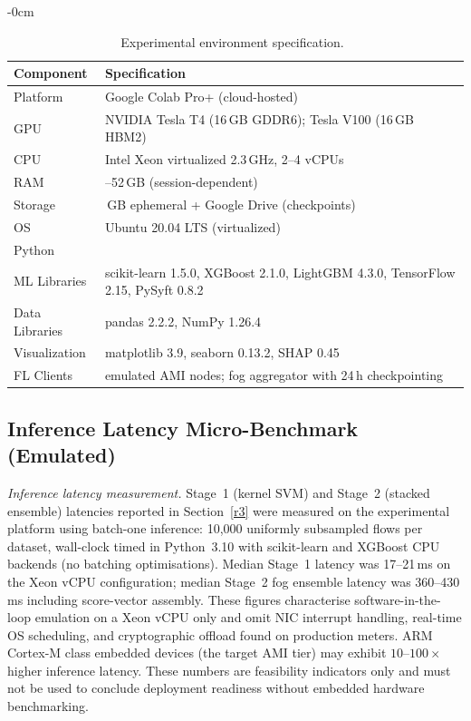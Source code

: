 \documentclass[sensors,article,submit,pdftex,moreauthors]{Definitions/mdpi}
\begin{document}
\begin{table}[H]
\caption{Experimental environment specification.~\label{tab:experimental_env}}
	\begin{adjustwidth}{-\extralength}{0cm}
		\begin{tabularx}{\fulllength}{>{\raggedright\arraybackslash}p{3cm} >{\raggedright\arraybackslash}X}
\toprule
\textbf{Component} & \textbf{Specification} \\
\midrule
Platform        & Google Colab Pro+ (cloud-hosted) \\
GPU             & NVIDIA Tesla T4 (16\,GB GDDR6); Tesla V100 (16\,GB HBM2) \\
CPU             & Intel Xeon virtualized 2.3\,GHz, 2--4 vCPUs \\
RAM             & 26--52\,GB (session-dependent) \\
Storage         & 100\,GB ephemeral + Google Drive (checkpoints) \\
OS              & Ubuntu 20.04 LTS (virtualized) \\
Python          & 3.10 \\
ML Libraries    & scikit-learn 1.5.0, XGBoost 2.1.0, LightGBM 4.3.0, TensorFlow 2.15, PySyft 0.8.2 \\
Data Libraries  & pandas 2.2.2, NumPy 1.26.4 \\
Visualization   & matplotlib 3.9, seaborn 0.13.2, SHAP 0.45 \\
FL Clients      & 50 emulated AMI nodes; fog aggregator with 24\,h checkpointing \\
\bottomrule
\end{tabularx}
	\end{adjustwidth}
\end{table}

\subsection{Inference Latency Micro-Benchmark (Emulated)}

\noindent\textit{Inference latency measurement.} Stage~1 (kernel SVM) and Stage~2 (stacked ensemble) latencies reported in Section~\ref{r3} were measured on the experimental platform using batch-one inference: 10{,}000 uniformly subsampled flows per dataset, wall-clock timed in Python~3.10 with scikit-learn and XGBoost CPU backends (no batching optimisations). Median Stage~1 latency was 17--21\,ms on the Xeon vCPU configuration; median Stage~2 fog ensemble latency was 360--430\,ms including score-vector assembly. These figures characterise software-in-the-loop emulation on a Xeon vCPU only and omit NIC interrupt handling, real-time OS scheduling, and cryptographic offload found on production meters. ARM Cortex-M class embedded devices (the target AMI tier) may exhibit $10$--$100\times$ higher inference latency. These numbers are feasibility indicators only and must not be used to conclude deployment readiness without embedded hardware benchmarking.
\end{document}
